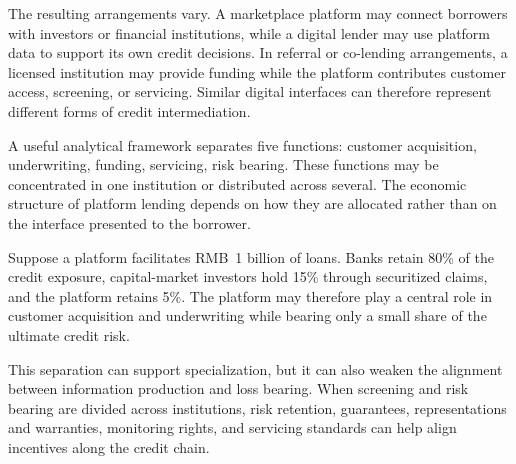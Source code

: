The resulting arrangements vary. A marketplace platform may connect borrowers with investors or financial institutions, while a digital lender may use platform data to support its own credit decisions. In referral or co-lending arrangements, a licensed institution may provide funding while the platform contributes customer access, screening, or servicing. Similar digital interfaces can therefore represent different forms of credit intermediation.

A useful analytical framework separates five functions:
customer acquisition, underwriting, funding, servicing, risk bearing. These functions may be concentrated in one institution or distributed across several. The economic structure of platform lending depends on how they are allocated rather than on the interface presented to the borrower.

Suppose a platform facilitates RMB~1 billion of loans. Banks retain 80\% of the credit exposure, capital-market investors hold 15\% through securitized claims, and the platform retains 5\%. The platform may therefore play a central role in customer acquisition and underwriting while bearing only a small share of the ultimate credit risk.

This separation can support specialization, but it can also weaken the alignment between information production and loss bearing. When screening and risk bearing are divided across institutions, risk retention, guarantees, representations and warranties, monitoring rights, and servicing standards can help align incentives along the credit chain.

